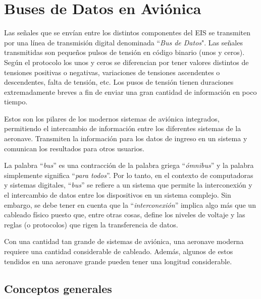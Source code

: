 \section{Buses de Datos en Avi\'onica}
\label{sec:U01.05.buses.datos.avionica}

    Las se\~nales que se env\'ian entre los distintos componentes del
    EIS se transmiten por una l\'inea de transmisi\'on digital
    denominada ``{\it Bus de Datos}". Las se\~nales transmitidas son
    peque\~nos pulsos de tensi\'on en c\'odigo binario (unos y
    ceros). Seg\'un el protocolo los unos y ceros se diferencian por
    tener valores distintos de tensiones positivas o negativas,
    variaciones de tensiones ascendentes o descendentes, falta de
    tensi\'on, etc. Los pusos de tensi\'on tienen duraciones
    extremadamente breves a fin de enviar una gran cantidad de
    informaci\'on en poco tiempo.

Estos son los pilares de los modernos sistemas de avi\'onica integrados, permitiendo el intercambio
de informaci\'on entre los diferentes sistemas de la aeronave. Transmiten la informaci\'on para
los datos de ingreso en un sistema y comunican los resultados para otros usuarios.

La palabra ``\emph{bus}'' es una contracción de la palabra griega ``\emph{ómnibus}'' y la palabra simplemente significa ``\emph{para todos}''. Por lo tanto, en el contexto de computadoras y sistemas digitales, ``\emph{bus}'' se refiere a un sistema que permite la interconexión y el intercambio de datos entre los dispositivos en un sistema complejo. Sin embargo, se debe tener en cuenta que la ``\emph{interconexión}'' implica algo más que un cableado físico puesto que, entre otras cosas, define los niveles de voltaje y las reglas (o protocolos) que rigen la transferencia de datos.

Con una cantidad tan grande de sistemas de aviónica, una aeronave moderna requiere una cantidad considerable de cableado. Además, algunos de estos tendidos en una aeronave grande pueden tener una longitud considerable.


\subsection{Conceptos generales}
\label{sec:01.05.01.01.conceptos.generales.buses}

